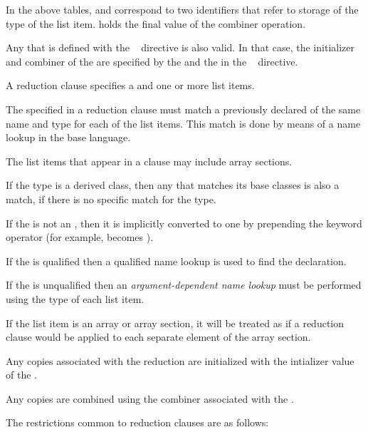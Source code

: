 In the above tables,  and  correspond to two
identifiers that refer to storage of the type of the list item. 
holds the final value of the combiner operation.

Any  that is defined with the ~
directive is also valid. In that case, the initializer and combiner of the
 are specified by the  and
the  in the ~ directive.




\descr
A reduction clause specifies a  and one or more list
items.

The  specified in a reduction clause must match a
previously declared  of the same name and type for
each of the list items. This match is done by means of a name lookup in the
base language.

The list items that appear in a  clause may include array sections.


\begin{cppspecific}
If the type is a derived class, then any  that
matches its base classes is also a match, if there is no specific match for the
type.

If the  is not an , then it is
implicitly converted to one by prepending the keyword operator (for example,
\code{+} becomes {\code{+}}).

If the  is qualified then a qualified name lookup is
used to find the declaration.

If the  is unqualified then an \emph{argument-dependent name lookup}
must be performed using the type of each list item.
\end{cppspecific}

If the list item is an array or array section, it will be treated as
if a reduction clause would be applied to each separate element
of the array section.

Any copies associated with the reduction are initialized with the intializer
value of the .

Any copies are combined using the combiner associated with the
.


\restrictions
The restrictions common to reduction clauses are as follows:

